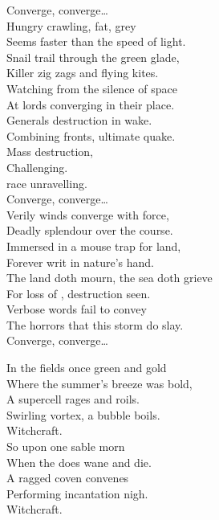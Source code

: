 Converge, converge… \\

Hungry crawling, fat, grey   \\
Seems faster than the speed of light. \\
Snail trail through the green glade, \\
Killer zig zags and flying kites. \\
Watching from the silence of space \\
At lords converging in their place. \\
Generals destruction in wake. \\
Combining fronts, ultimate quake. \\

Mass destruction, \\
Challenging. \\
 race unravelling. \\

Converge, converge… \\

Verily winds converge with force, \\
Deadly splendour over the course. \\
Immersed in a mouse trap for land, \\
Forever writ in nature's hand. \\
The land doth mourn, the sea doth grieve \\
For loss of , destruction seen. \\
Verbose words fail to convey \\
The horrors that this storm do slay. \\

Converge, converge… \\




In the fields once green and gold \\
Where the summer's breeze was bold, \\
A supercell rages and roils. \\
Swirling vortex, a bubble boils. \\
Witchcraft. \\

So upon one sable morn \\
When the  does wane and die. \\
A ragged coven convenes \\
Performing incantation nigh. \\
Witchcraft. \\

